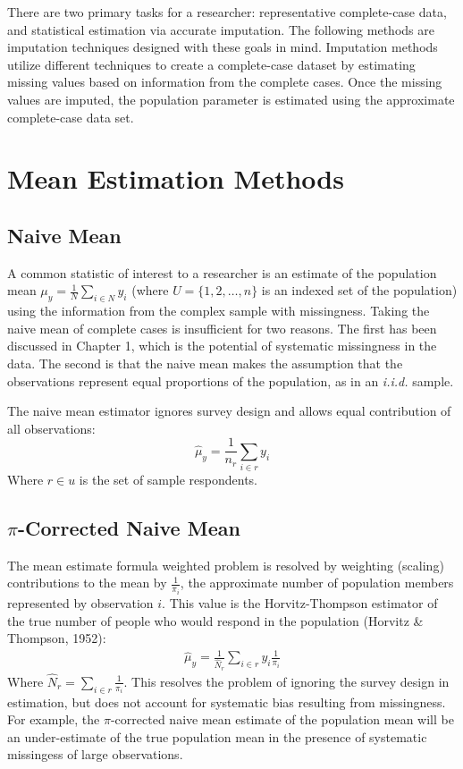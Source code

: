 \documentclass[12pt,twoside]{reedthesis}
\begin{document}
There are two primary tasks for a researcher: representative
complete-case data, and statistical estimation via accurate imputation.
The following methods are imputation techniques designed with these
goals in mind. Imputation methods utilize different techniques to create
a complete-case dataset by estimating missing values based on
information from the complete cases. Once the missing values are
imputed, the population parameter is estimated using the approximate
complete-case data set.

\section{Mean Estimation Methods}\label{mean-estimation-methods}

\subsection{Naive Mean}\label{naive-mean}

A common statistic of interest to a researcher is an estimate of the
population mean \(\mu_y = \frac{1}{N}\sum_{i \in N} y_i\) (where
\(U = \{1,2, \dots, n\}\) is an indexed set of the population) using the
information from the complex sample with missingness. Taking the naive
mean of complete cases is insufficient for two reasons. The first has
been discussed in Chapter 1, which is the potential of systematic
missingness in the data. The second is that the naive mean makes the
assumption that the observations represent equal proportions of the
population, as in an \emph{i.i.d.} sample.

The naive mean estimator ignores survey design and allows equal
contribution of all observations: \[
\hat \mu_y = \frac{1}{n_r} \sum_{i \in r} y_i
\] Where \(r \in u\) is the set of sample respondents.

\subsection{\texorpdfstring{\(\pi\)-Corrected Naive
Mean}{\textbackslash{}pi-Corrected Naive Mean}}\label{pi-corrected-naive-mean}

The mean estimate formula weighted problem is resolved by weighting
(scaling) contributions to the mean by \(\frac{1}{\pi_i}\), the
approximate number of population members represented by observation
\(i\). This value is the Horvitz-Thompson estimator of the true number
of people who would respond in the population (Horvitz \& Thompson,
1952):
\begin{align}
\hat \mu_y = \frac{1}{\hat N_r} \sum_{i \in r} y_i \frac{1}{\pi_i} \label{eq:HTE}
\end{align}
Where \(\hat N_r = \sum_{i \in r} \frac{1}{\pi_i}\). This resolves the
problem of ignoring the survey design in estimation, but does not
account for systematic bias resulting from missingness. For example, the
\(\pi\)-corrected naive mean estimate of the population mean will be an
under-estimate of the true population mean in the presence of systematic
missingess of large observations.
\end{document}
